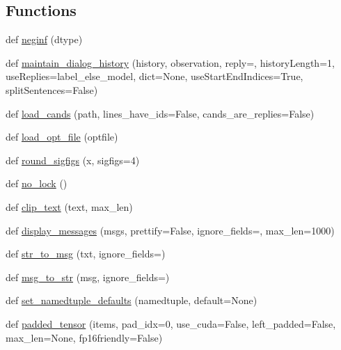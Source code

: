 \subsection*{Functions}
\begin{DoxyCompactItemize}
\item 
def \hyperlink{namespaceparlai_1_1utils_1_1misc_a68c44ca571de7149b683539db659c330}{neginf} (dtype)
\item 
def \hyperlink{namespaceparlai_1_1utils_1_1misc_ac8ca45e62ca906d9b6e5026588a5d2a2}{maintain\+\_\+dialog\+\_\+history} (history, observation, reply=\textquotesingle{}\textquotesingle{}, history\+Length=1, use\+Replies=\textquotesingle{}label\+\_\+else\+\_\+model\textquotesingle{}, dict=None, use\+Start\+End\+Indices=True, split\+Sentences=False)
\item 
def \hyperlink{namespaceparlai_1_1utils_1_1misc_ad935ab0a9d49b897c5e3efdbe1c46c4d}{load\+\_\+cands} (path, lines\+\_\+have\+\_\+ids=False, cands\+\_\+are\+\_\+replies=False)
\item 
def \hyperlink{namespaceparlai_1_1utils_1_1misc_a7c97ef3250327bc549ac652a481be0cf}{load\+\_\+opt\+\_\+file} (optfile)
\item 
def \hyperlink{namespaceparlai_1_1utils_1_1misc_af245c261b10f36175f6d88fce852c552}{round\+\_\+sigfigs} (x, sigfigs=4)
\item 
def \hyperlink{namespaceparlai_1_1utils_1_1misc_a38a23cfa0fc3dbed42846787d1c04b57}{no\+\_\+lock} ()
\item 
def \hyperlink{namespaceparlai_1_1utils_1_1misc_a219b248f4399036a381ca859aa97433e}{clip\+\_\+text} (text, max\+\_\+len)
\item 
def \hyperlink{namespaceparlai_1_1utils_1_1misc_a146f303a4c4b34993458968c74b55d2f}{display\+\_\+messages} (msgs, prettify=False, ignore\+\_\+fields=\textquotesingle{}\textquotesingle{}, max\+\_\+len=1000)
\item 
def \hyperlink{namespaceparlai_1_1utils_1_1misc_a1b053cd9c56e6fa79b058fff587b3a48}{str\+\_\+to\+\_\+msg} (txt, ignore\+\_\+fields=\textquotesingle{}\textquotesingle{})
\item 
def \hyperlink{namespaceparlai_1_1utils_1_1misc_ae5db473b41d3b49814e2566e866282b6}{msg\+\_\+to\+\_\+str} (msg, ignore\+\_\+fields=\textquotesingle{}\textquotesingle{})
\item 
def \hyperlink{namespaceparlai_1_1utils_1_1misc_a8781cc03272b3a118fcd9e5a9f4ca1dd}{set\+\_\+namedtuple\+\_\+defaults} (namedtuple, default=None)
\item 
def \hyperlink{namespaceparlai_1_1utils_1_1misc_ad3f3c350e8b394482f73a240e19ec3ac}{padded\+\_\+tensor} (items, pad\+\_\+idx=0, use\+\_\+cuda=False, left\+\_\+padded=False, max\+\_\+len=None, fp16friendly=False)

\end{DoxyCompactItemize}
